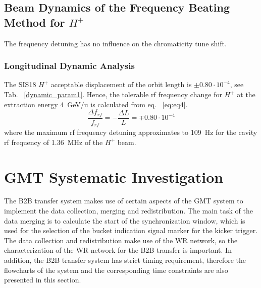 \subsection{Beam Dynamics of the Frequency Beating Method for $H^+$} 
The frequency detuning has no influence on the chromaticity tune shift.

\subsubsection{Longitudinal Dynamic Analysis}

The SIS18 $H^+$ acceptable displacement of the orbit length is $\pm0.80\cdot10^{-4}$, see Tab. ~\ref{dynamic_param1}. Hence, the tolerable rf frequency change for $H^{+}$ at the extraction energy \SI{4}{GeV/u} is calculated from eq. ~\ref{eq:eq4}.
\begin{equation}
\frac{\Delta{f}_\mathit{rf}}{f_\mathit{rf}} = -\frac{\Delta L}{L}= \mp 0.80 \cdot 10^{-4}
\end{equation}
where the maximum rf frequency detuning approximates to \SI{109}{Hz} for the cavity rf frequency of \SI{1.36}{MHz} of the $H^+$ beam.
\section{GMT Systematic Investigation}
\label{real_timing}
The B2B transfer system makes use of certain aspects of the GMT system to implement the data collection, merging and redistribution. The main task of the data merging is to calculate the start of the synchronization window, which is used for the selection of the bucket indication signal marker for the kicker trigger. The data collection and redistribution make use of the WR network, so the characterization of the WR network for the B2B transfer is important. In addition, the B2B transfer system has strict timing requirement, therefore the flowcharts of the system and the corresponding time constraints are also presented in this section. 


